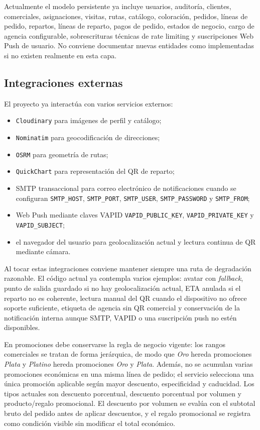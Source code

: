 Actualmente el modelo persistente ya incluye usuarios, auditoría, clientes, comerciales, asignaciones, visitas, rutas, catálogo, coloración, pedidos, líneas de pedido, repartos, líneas de reparto, pagos de pedido, estados de negocio, cargo de agencia configurable, sobrescrituras técnicas de rate limiting y suscripciones Web Push de usuario. No conviene documentar nuevas entidades como implementadas si no existen realmente en esta capa.

\subsection{Integraciones externas}

El proyecto ya interactúa con varios servicios externos:

\begin{itemize}
    \item \texttt{Cloudinary} para imágenes de perfil y catálogo;
    \item \texttt{Nominatim} para geocodificación de direcciones;
    \item \texttt{OSRM} para geometría de rutas;
    \item \texttt{QuickChart} para representación del QR de reparto;
    \item SMTP transaccional para correo electrónico de notificaciones cuando se configuran \texttt{SMTP\_HOST}, \texttt{SMTP\_PORT}, \texttt{SMTP\_USER}, \texttt{SMTP\_PASSWORD} y \texttt{SMTP\_FROM};
    \item Web Push mediante claves VAPID \texttt{VAPID\_PUBLIC\_KEY}, \texttt{VAPID\_PRIVATE\_KEY} y \texttt{VAPID\_SUBJECT};
    \item el navegador del usuario para geolocalización actual y lectura continua de QR mediante cámara.
\end{itemize}

Al tocar estas integraciones conviene mantener siempre una ruta de degradación razonable. El código actual ya contempla varios ejemplos: avatar con \textit{fallback}, punto de salida guardado si no hay geolocalización actual, ETA anulada si el reparto no es coherente, lectura manual del QR cuando el dispositivo no ofrece soporte suficiente, etiqueta de agencia sin QR comercial y conservación de la notificación interna aunque SMTP, VAPID o una suscripción push no estén disponibles.

En promociones debe conservarse la regla de negocio vigente: los rangos comerciales se tratan de forma jerárquica, de modo que \textit{Oro} hereda promociones \textit{Plata} y \textit{Platino} hereda promociones \textit{Oro} y \textit{Plata}. Además, no se acumulan varias promociones económicas en una misma línea de pedido; el servicio selecciona una única promoción aplicable según mayor descuento, especificidad y caducidad. Los tipos actuales son descuento porcentual, descuento porcentual por volumen y producto/regalo promocional. El descuento por volumen se evalúa con el subtotal bruto del pedido antes de aplicar descuentos, y el regalo promocional se registra como condición visible sin modificar el total económico.

